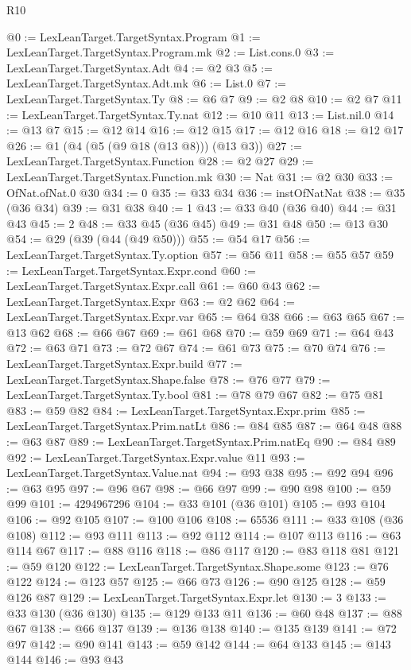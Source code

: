 \begin{lexlean}{R10}
\begin{coremodule}
@0 := LexLeanTarget.TargetSyntax.Program
@1 := LexLeanTarget.TargetSyntax.Program.mk
@2 := List.cons.{0}
@3 := LexLeanTarget.TargetSyntax.Adt
@4 := @2 @3
@5 := LexLeanTarget.TargetSyntax.Adt.mk
@6 := List.{0}
@7 := LexLeanTarget.TargetSyntax.Ty
@8 := @6 @7
@9 := @2 @8
@10 := @2 @7
@11 := LexLeanTarget.TargetSyntax.Ty.nat
@12 := @10 @11
@13 := List.nil.{0}
@14 := @13 @7
@15 := @12 @14
@16 := @12 @15
@17 := @12 @16
@18 := @12 @17
@26 := @1 (@4 (@5 (@9 @18 (@13 @8))) (@13 @3))
@27 := LexLeanTarget.TargetSyntax.Function
@28 := @2 @27
@29 := LexLeanTarget.TargetSyntax.Function.mk
@30 := Nat
@31 := @2 @30
@33 := OfNat.ofNat.{0} @30
@34 := 0
@35 := @33 @34
@36 := instOfNatNat
@38 := @35 (@36 @34)
@39 := @31 @38
@40 := 1
@43 := @33 @40 (@36 @40)
@44 := @31 @43
@45 := 2
@48 := @33 @45 (@36 @45)
@49 := @31 @48
@50 := @13 @30
@54 := @29 (@39 (@44 (@49 @50)))
@55 := @54 @17
@56 := LexLeanTarget.TargetSyntax.Ty.option
@57 := @56 @11
@58 := @55 @57
@59 := LexLeanTarget.TargetSyntax.Expr.cond
@60 := LexLeanTarget.TargetSyntax.Expr.call
@61 := @60 @43
@62 := LexLeanTarget.TargetSyntax.Expr
@63 := @2 @62
@64 := LexLeanTarget.TargetSyntax.Expr.var
@65 := @64 @38
@66 := @63 @65
@67 := @13 @62
@68 := @66 @67
@69 := @61 @68
@70 := @59 @69
@71 := @64 @43
@72 := @63 @71
@73 := @72 @67
@74 := @61 @73
@75 := @70 @74
@76 := LexLeanTarget.TargetSyntax.Expr.build
@77 := LexLeanTarget.TargetSyntax.Shape.false
@78 := @76 @77
@79 := LexLeanTarget.TargetSyntax.Ty.bool
@81 := @78 @79 @67
@82 := @75 @81
@83 := @59 @82
@84 := LexLeanTarget.TargetSyntax.Expr.prim
@85 := LexLeanTarget.TargetSyntax.Prim.natLt
@86 := @84 @85
@87 := @64 @48
@88 := @63 @87
@89 := LexLeanTarget.TargetSyntax.Prim.natEq
@90 := @84 @89
@92 := LexLeanTarget.TargetSyntax.Expr.value @11
@93 := LexLeanTarget.TargetSyntax.Value.nat
@94 := @93 @38
@95 := @92 @94
@96 := @63 @95
@97 := @96 @67
@98 := @66 @97
@99 := @90 @98
@100 := @59 @99
@101 := 4294967296
@104 := @33 @101 (@36 @101)
@105 := @93 @104
@106 := @92 @105
@107 := @100 @106
@108 := 65536
@111 := @33 @108 (@36 @108)
@112 := @93 @111
@113 := @92 @112
@114 := @107 @113
@116 := @63 @114 @67
@117 := @88 @116
@118 := @86 @117
@120 := @83 @118 @81
@121 := @59 @120
@122 := LexLeanTarget.TargetSyntax.Shape.some
@123 := @76 @122
@124 := @123 @57
@125 := @66 @73
@126 := @90 @125
@128 := @59 @126 @87
@129 := LexLeanTarget.TargetSyntax.Expr.let
@130 := 3
@133 := @33 @130 (@36 @130)
@135 := @129 @133 @11
@136 := @60 @48
@137 := @88 @67
@138 := @66 @137
@139 := @136 @138
@140 := @135 @139
@141 := @72 @97
@142 := @90 @141
@143 := @59 @142
@144 := @64 @133
@145 := @143 @144
@146 := @93 @43

\end{coremodule}
\end{lexlean}
